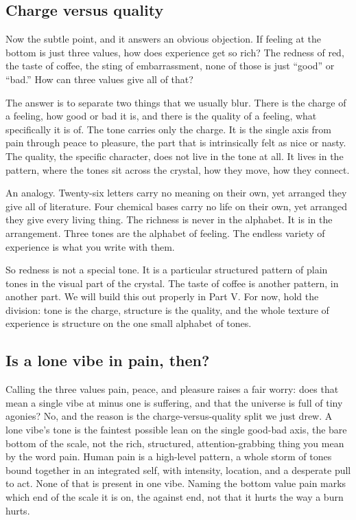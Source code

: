 \subsection{Charge versus quality}

Now the subtle point, and it answers an obvious objection. If feeling at the bottom is just three values, how does experience get so rich? The redness of red, the taste of coffee, the sting of embarrassment, none of those is just ``good'' or ``bad.'' How can three values give all of that?

The answer is to separate two things that we usually blur. There is the charge of a feeling, how good or bad it is, and there is the quality of a feeling, what specifically it is of. The tone carries only the charge. It is the single axis from pain through peace to pleasure, the part that is intrinsically felt as nice or nasty. The quality, the specific character, does not live in the tone at all. It lives in the pattern, where the tones sit across the crystal, how they move, how they connect.

An analogy. Twenty-six letters carry no meaning on their own, yet arranged they give all of literature. Four chemical bases carry no life on their own, yet arranged they give every living thing. The richness is never in the alphabet. It is in the arrangement. Three tones are the alphabet of feeling. The endless variety of experience is what you write with them.

So redness is not a special tone. It is a particular structured pattern of plain tones in the visual part of the crystal. The taste of coffee is another pattern, in another part. We will build this out properly in Part V. For now, hold the division: tone is the charge, structure is the quality, and the whole texture of experience is structure on the one small alphabet of tones.

\subsection{Is a lone vibe in pain, then?}

Calling the three values pain, peace, and pleasure raises a fair worry: does that mean a single vibe at minus one is suffering, and that the universe is full of tiny agonies? No, and the reason is the charge-versus-quality split we just drew. A lone vibe's tone is the faintest possible lean on the single good-bad axis, the bare bottom of the scale, not the rich, structured, attention-grabbing thing you mean by the word pain. Human pain is a high-level pattern, a whole storm of tones bound together in an integrated self, with intensity, location, and a desperate pull to act. None of that is present in one vibe. Naming the bottom value pain marks which end of the scale it is on, the against end, not that it hurts the way a burn hurts.

